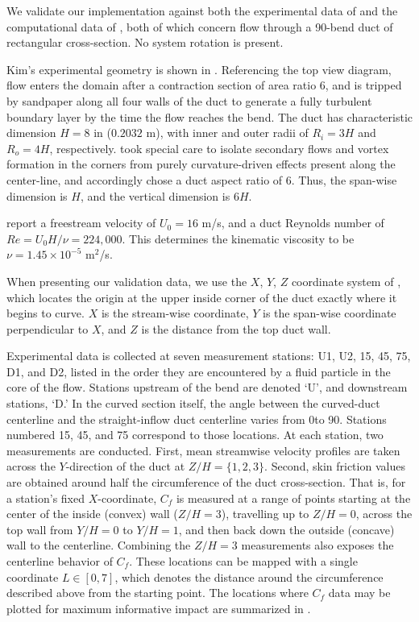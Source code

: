 \documentclass[11pt]{article}
\begin{document}
We validate our implementation against both the experimental data of \citet{kim1994} and the computational data of \citet{shur2000}, both of which concern flow through a 90\degree-bend duct of rectangular cross-section. No system rotation is present.

Kim's experimental geometry is shown in . Referencing the top view diagram, flow enters the domain after a contraction section of area ratio 6, and is tripped by sandpaper along all four walls of the duct to generate a fully turbulent boundary layer by the time the flow reaches the bend. The duct has characteristic dimension $H = 8$ in ($0.2032$ m), with inner and outer radii of $R_i=3H$ and $R_o=4H$, respectively. \citet{kim1994} took special care to isolate secondary flows and vortex formation in the corners from purely curvature-driven effects present along the center-line, and accordingly chose a duct aspect ratio of 6. Thus, the span-wise dimension is $H$, and the vertical dimension is $6H$.

\citet{kim1994} report a freestream velocity of $U_0 = 16$ m/s, and a duct Reynolds number of $Re = U_0 H / \nu = 224,000$. This determines the kinematic viscosity to be $\nu = 1.45 \times 10^{-5}$ m$^2$/s.

When presenting our validation data, we use the $X$, $Y$, $Z$ coordinate system of \citet{kim1994}, which locates the origin at the upper inside corner of the duct exactly where it begins to curve. $X$ is the stream-wise coordinate, $Y$ is the span-wise coordinate perpendicular to $X$, and $Z$ is the distance from the top duct wall.

Experimental data is collected at seven measurement stations: U1, U2, 15, 45, 75, D1, and D2, listed in the order they are encountered by a fluid particle in the core of the flow. Stations upstream of the bend are denoted `U', and downstream stations, `D.' In the curved section itself, the angle between the curved-duct centerline and the straight-inflow duct centerline varies from 0\degree to 90\degree. Stations numbered 15, 45, and 75 correspond to those locations. At each station, two measurements are conducted. First, mean streamwise velocity profiles are taken across the $Y$-direction of the duct at $Z/H = \{1,2,3\}$. Second, skin friction values are obtained around half the circumference of the duct cross-section. That is, for a station's fixed $X$-coordinate, $C_f$ is measured at a range of points starting at the center of the inside (convex) wall ($Z/H = 3$), travelling up to $Z/H=0$, across the top wall from $Y/H=0$ to $Y/H=1$, and then back down the outside (concave) wall to the centerline. Combining the $Z/H=3$ measurements also exposes the centerline behavior of $C_f$. These locations can be mapped with a single coordinate $L \in [0,7]$, which denotes the distance around the circumference described above from the starting point. The locations where $C_f$ data may be plotted for maximum informative impact are summarized in .
\end{document}
